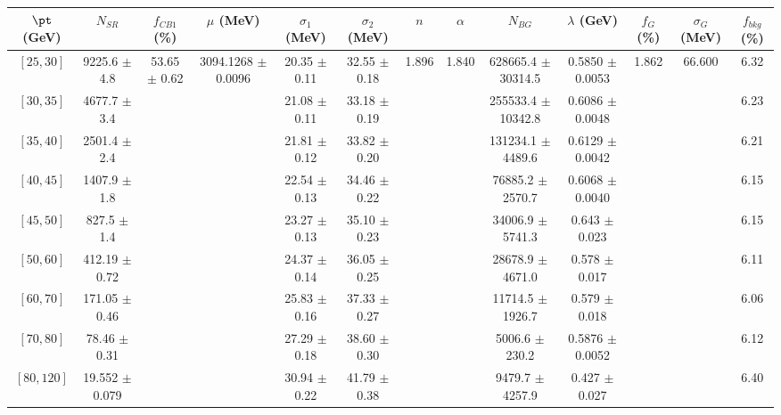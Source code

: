 \begin{tabular}{c||c|c|c|c|c|c|c|c|c|c|c||c}
$\pt$ (GeV) & $N_{SR}$ & $f_{CB1}$ (\%) & $\mu$ (MeV) & $\sigma_1$ (MeV) & $\sigma_2$ (MeV) & $n$ & $\alpha$ & $N_{BG}$ & $\lambda$ (GeV) & $f_G$ (\%) & $\sigma_G$ (MeV) & $f_{bkg}$ (\%) \\
\hline
$[25, 30]$ & 9225.6 $\pm$ 4.8 & \multirow{9}{*}{53.65 $\pm$ 0.62} & \multirow{9}{*}{3094.1268 $\pm$ 0.0096} & 20.35 $\pm$ 0.11 & 32.55 $\pm$ 0.18 & \multirow{9}{*}{1.896} & \multirow{9}{*}{1.840} & 628665.4 $\pm$ 30314.5 & 0.5850 $\pm$ 0.0053 & \multirow{9}{*}{1.862} & \multirow{9}{*}{66.600} & 6.32\\
$[30, 35]$ & 4677.7 $\pm$ 3.4 &  &  & 21.08 $\pm$ 0.11 & 33.18 $\pm$ 0.19 &  &  & 255533.4 $\pm$ 10342.8 & 0.6086 $\pm$ 0.0048 &  &  & 6.23\\
$[35, 40]$ & 2501.4 $\pm$ 2.4 &  &  & 21.81 $\pm$ 0.12 & 33.82 $\pm$ 0.20 &  &  & 131234.1 $\pm$ 4489.6 & 0.6129 $\pm$ 0.0042 &  &  & 6.21\\
$[40, 45]$ & 1407.9 $\pm$ 1.8 &  &  & 22.54 $\pm$ 0.13 & 34.46 $\pm$ 0.22 &  &  & 76885.2 $\pm$ 2570.7 & 0.6068 $\pm$ 0.0040 &  &  & 6.15\\
$[45, 50]$ & 827.5 $\pm$ 1.4 &  &  & 23.27 $\pm$ 0.13 & 35.10 $\pm$ 0.23 &  &  & 34006.9 $\pm$ 5741.3 & 0.643 $\pm$ 0.023 &  &  & 6.15\\
$[50, 60]$ & 412.19 $\pm$ 0.72 &  &  & 24.37 $\pm$ 0.14 & 36.05 $\pm$ 0.25 &  &  & 28678.9 $\pm$ 4671.0 & 0.578 $\pm$ 0.017 &  &  & 6.11\\
$[60, 70]$ & 171.05 $\pm$ 0.46 &  &  & 25.83 $\pm$ 0.16 & 37.33 $\pm$ 0.27 &  &  & 11714.5 $\pm$ 1926.7 & 0.579 $\pm$ 0.018 &  &  & 6.06\\
$[70, 80]$ & 78.46 $\pm$ 0.31 &  &  & 27.29 $\pm$ 0.18 & 38.60 $\pm$ 0.30 &  &  & 5006.6 $\pm$ 230.2 & 0.5876 $\pm$ 0.0052 &  &  & 6.12\\
$[80, 120]$ & 19.552 $\pm$ 0.079 &  &  & 30.94 $\pm$ 0.22 & 41.79 $\pm$ 0.38 &  &  & 9479.7 $\pm$ 4257.9 & 0.427 $\pm$ 0.027 &  &  & 6.40\\
\end{tabular}
